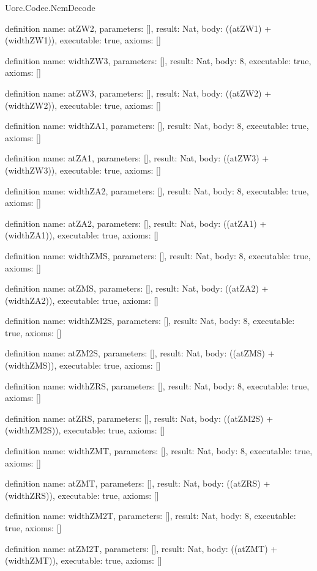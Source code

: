 \begin{lexlean}{Uorc.Codec.NcmDecode}
\begin{semanticmodule}
definition{
  name: atZW2,
  parameters: [],
  result: Nat,
  body: ((atZW1) + (widthZW1)),
  executable: true,
  axioms: []
}

definition{
  name: widthZW3,
  parameters: [],
  result: Nat,
  body: 8,
  executable: true,
  axioms: []
}

definition{
  name: atZW3,
  parameters: [],
  result: Nat,
  body: ((atZW2) + (widthZW2)),
  executable: true,
  axioms: []
}

definition{
  name: widthZA1,
  parameters: [],
  result: Nat,
  body: 8,
  executable: true,
  axioms: []
}

definition{
  name: atZA1,
  parameters: [],
  result: Nat,
  body: ((atZW3) + (widthZW3)),
  executable: true,
  axioms: []
}

definition{
  name: widthZA2,
  parameters: [],
  result: Nat,
  body: 8,
  executable: true,
  axioms: []
}

definition{
  name: atZA2,
  parameters: [],
  result: Nat,
  body: ((atZA1) + (widthZA1)),
  executable: true,
  axioms: []
}

definition{
  name: widthZMS,
  parameters: [],
  result: Nat,
  body: 8,
  executable: true,
  axioms: []
}

definition{
  name: atZMS,
  parameters: [],
  result: Nat,
  body: ((atZA2) + (widthZA2)),
  executable: true,
  axioms: []
}

definition{
  name: widthZM2S,
  parameters: [],
  result: Nat,
  body: 8,
  executable: true,
  axioms: []
}

definition{
  name: atZM2S,
  parameters: [],
  result: Nat,
  body: ((atZMS) + (widthZMS)),
  executable: true,
  axioms: []
}

definition{
  name: widthZRS,
  parameters: [],
  result: Nat,
  body: 8,
  executable: true,
  axioms: []
}

definition{
  name: atZRS,
  parameters: [],
  result: Nat,
  body: ((atZM2S) + (widthZM2S)),
  executable: true,
  axioms: []
}

definition{
  name: widthZMT,
  parameters: [],
  result: Nat,
  body: 8,
  executable: true,
  axioms: []
}

definition{
  name: atZMT,
  parameters: [],
  result: Nat,
  body: ((atZRS) + (widthZRS)),
  executable: true,
  axioms: []
}

definition{
  name: widthZM2T,
  parameters: [],
  result: Nat,
  body: 8,
  executable: true,
  axioms: []
}

definition{
  name: atZM2T,
  parameters: [],
  result: Nat,
  body: ((atZMT) + (widthZMT)),
  executable: true,
  axioms: []
}


\end{semanticmodule}
\end{lexlean}
